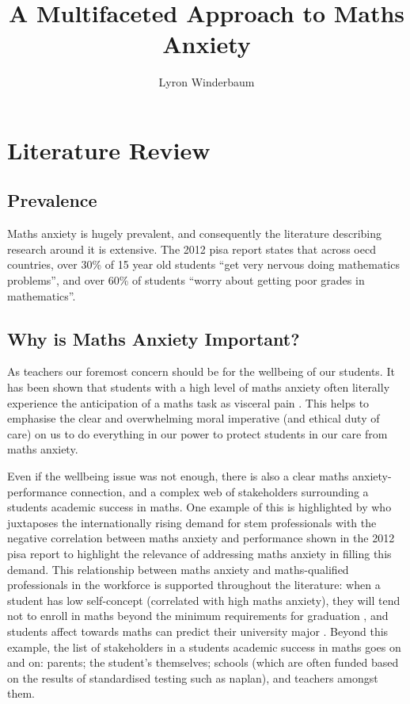 \documentclass[14pt]{memoir}
\title{A Multifaceted Approach to Maths Anxiety}
\author{Lyron Winderbaum}
\begin{document}
\maketitle



\begin{abstract}

\lipsum[1-2]

\end{abstract}


\glsresetall
\section{Literature Review}

\subsection*{Prevalence}

Maths anxiety is hugely prevalent, and consequently the literature describing research around it is extensive. The  2012 \gls{pisa} report states that across \gls{oecd} countries, over 30\% of 15 year old students ``get very nervous doing mathematics problems'', and over 60\% of students ``worry about getting poor grades in mathematics''. 

\subsection*{Why is Maths Anxiety Important?}

As teachers our foremost concern should be for the wellbeing of our students. It has been shown that students with a high level of maths anxiety often literally experience the anticipation of a maths task as visceral pain \cite{Lyons2012pain}. This helps to emphasise the clear and overwhelming moral imperative (and ethical duty of care) on us to do everything in our power to protect students in our care from maths anxiety.

Even if the wellbeing issue was not enough, there is also a clear maths anxiety-performance connection, and a complex web of stakeholders surrounding a students academic success in maths. One example of this is highlighted by  who juxtaposes the internationally rising demand for \gls{stem} professionals with the negative correlation between maths anxiety and performance shown in the 2012 \gls{pisa} \cite{PISA2013} report to highlight the relevance of addressing maths anxiety in filling this demand. This relationship between maths anxiety and maths-qualified professionals in the workforce is supported throughout the literature: when a student has low self-concept (correlated with high maths anxiety), they will tend not to enroll in maths beyond the minimum requirements for graduation \cite{Ashcraft2007book}, and students affect towards maths can predict their university major \cite{LeFevre1992}. Beyond this example, the list of stakeholders in a students academic success in maths goes on and on: parents; the student's themselves; schools (which are often funded based on the results of standardised testing such as \gls{naplan}), and teachers amongst them. 
\end{document}
